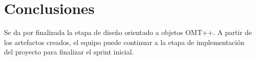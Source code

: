 \section{Conclusiones}
Se da por finalizada la etapa de diseño orientado a objetos OMT++. A partir de los artefactos creados, el equipo puede continuar a la etapa de implementación del proyecto para finalizar el sprint inicial.
